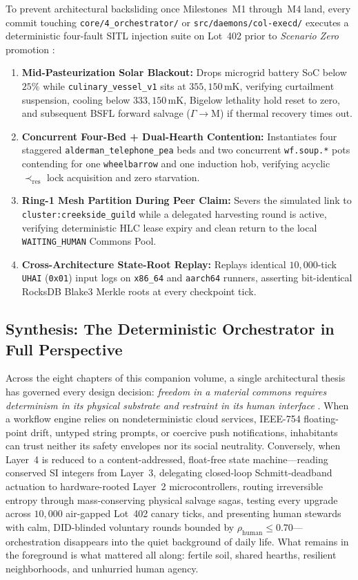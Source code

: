 To prevent architectural backsliding once Milestones~M1 through~M4 land, every commit touching \texttt{core/4\_orchestrator/} or \texttt{src/daemons/col-execd/} executes a deterministic four-fault SITL injection suite on Lot~402 prior to \emph{Scenario Zero} promotion \parencite{kleppmann2017designing}:
\begin{enumerate}
  \item \textbf{Mid-Pasteurization Solar Blackout:} Drops microgrid battery SoC below $25\%$ while \texttt{culinary\_vessel\_v1} sits at $355{,}150\,\text{mK}$, verifying curtailment suspension, cooling below $333{,}150\,\text{mK}$, Bigelow lethality hold reset to zero, and subsequent BSFL forward salvage ($\Gamma \to \text{M}$) if thermal recovery times out.
  \item \textbf{Concurrent Four-Bed + Dual-Hearth Contention:} Instantiates four staggered \texttt{alderman\_telephone\_pea} beds and two concurrent \texttt{wf.soup.*} pots contending for one \texttt{wheelbarrow} and one induction hob, verifying acyclic $\prec_{\text{res}}$ lock acquisition and zero starvation.
  \item \textbf{Ring-1 Mesh Partition During Peer Claim:} Severs the simulated link to \texttt{cluster:creekside\_guild} while a delegated harvesting round is active, verifying deterministic HLC lease expiry and clean return to the local \texttt{WAITING\_HUMAN} Commons Pool.
  \item \textbf{Cross-Architecture State-Root Replay:} Replays identical $10{,}000$-tick \texttt{UHAI} (\texttt{0x01}) input logs on \texttt{x86\_64} and \texttt{aarch64} runners, asserting bit-identical RocksDB Blake3 Merkle roots at every checkpoint tick.
\end{enumerate}

\subsection{Synthesis: The Deterministic Orchestrator in Full Perspective}

Across the eight chapters of this companion volume, a single architectural thesis has governed every design decision: \emph{freedom in a material commons requires determinism in its physical substrate and restraint in its human interface} \parencite{beer1974,illich1973,ostrom1990}. When a workflow engine relies on nondeterministic cloud services, IEEE-754 floating-point drift, untyped string prompts, or coercive push notifications, inhabitants can trust neither its safety envelopes nor its social neutrality. Conversely, when Layer~4 is reduced to a content-addressed, float-free state machine---reading conserved SI integers from Layer~3, delegating closed-loop Schmitt-deadband actuation to hardware-rooted Layer~2 microcontrollers, routing irreversible entropy through mass-conserving physical salvage sagas, testing every upgrade across $10{,}000$ air-gapped Lot~402 canary ticks, and presenting human stewards with calm, DID-blinded voluntary rounds bounded by $\rho_{\text{human}} \le 0.70$---orchestration disappears into the quiet background of daily life. What remains in the foreground is what mattered all along: fertile soil, shared hearths, resilient neighborhoods, and unhurried human agency.
